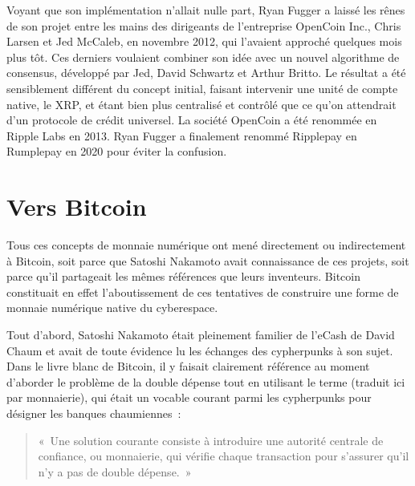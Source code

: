 Voyant que son implémentation n'allait nulle part, Ryan Fugger a laissé les rênes de son projet entre les mains des dirigeants de l'entreprise OpenCoin Inc., Chris Larsen et Jed McCaleb, en novembre 2012, qui l'avaient approché quelques mois plus tôt. Ces derniers voulaient combiner son idée avec un nouvel algorithme de consensus, développé par Jed, David Schwartz et Arthur Britto. Le résultat a été sensiblement différent du concept initial, faisant intervenir une unité de compte native, le XRP, et étant bien plus centralisé et contrôlé que ce qu'on attendrait d'un protocole de crédit universel. La société OpenCoin a été renommée en Ripple Labs en 2013. Ryan Fugger a finalement renommé Ripplepay en Rumplepay en 2020 pour éviter la confusion.

\section*{Vers Bitcoin}

Tous ces concepts de monnaie numérique ont mené directement ou indirectement à Bitcoin, soit parce que Satoshi Nakamoto avait connaissance de ces projets, soit parce qu'il partageait les mêmes références que leurs inventeurs. Bitcoin constituait en effet l'aboutissement de ces tentatives de construire une forme de monnaie numérique native du cyberespace.

Tout d'abord, Satoshi Nakamoto était pleinement familier de l'eCash de David Chaum et avait de toute évidence lu les échanges des cypherpunks à son sujet. Dans le livre blanc de Bitcoin, il y faisait clairement référence au moment d'aborder le problème de la double dépense tout en utilisant le terme  (traduit ici par monnaierie), qui était un vocable courant parmi les cypherpunks pour désigner les banques chaumiennes~:

\begin{quote}
«~Une solution courante consiste à introduire une autorité centrale de confiance, ou monnaierie, qui vérifie chaque transaction pour s'assurer qu'il n'y a pas de double dépense.~»
\end{quote}

